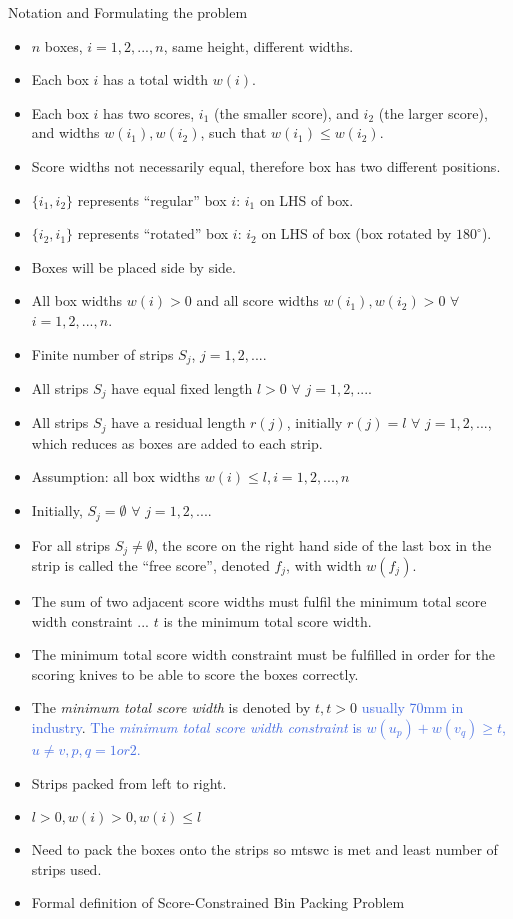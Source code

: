 \documentclass[oribibl]{llncs}
\begin{document}
Notation and Formulating the problem
\begin{itemize}
	\item $n$ boxes, $i = 1, 2, ..., n$, same height, different widths.
	\item Each box $i$ has a total width $w(i)$.
	\item Each box $i$ has two scores, $i_1$ (the smaller score), and $i_2$ (the larger score), and widths $w(i_1), w(i_2)$, such that $w(i_1) \leq w(i_2)$.
	\item Score widths not necessarily equal, therefore box has two different positions.
	\item $\{i_1, i_2\}$ represents ``regular'' box $i$: $i_1$ on LHS of box.
	\item $\{i_2, i_1\}$ represents ``rotated'' box $i$: $i_2$ on LHS of box (box rotated by $180^{\circ}$).
	\item Boxes will be placed side by side.
	\item All box widths $w(i) > 0$ and all score widths $w(i_1), w(i_2) > 0$ $\forall$ $i = 1, 2, ..., n$.
	\item Finite number of strips $S_j$, $j = 1, 2, ...$.
	\item All strips $S_j$ have equal fixed length $l > 0$ $\forall$ $j = 1, 2, ...$.
	\item All strips $S_j$ have a residual length $r(j)$, initially $r(j) = l$ $\forall$ $j = 1,2, ...$, which reduces as boxes are added to each strip.
	\item Assumption: all box widths $w(i) \leq l, i = 1, 2, ..., n$
	\item Initially, $S_j = \emptyset$ $\forall$ $j = 1, 2, ...$.
	\item For all strips $S_j \neq \emptyset$, the score on the right hand side of the last box in the strip is called the ``free score'', denoted $f_j$, with width $w(f_j)$.
	\item The sum of two adjacent score widths must fulfil the minimum total score width constraint ... $t$ is the minimum total score width.
	\item The minimum total score width constraint must be fulfilled in order for the scoring knives to be able to score the boxes correctly.
	\item The \textit{minimum total score width} is denoted by $t, t > 0$ \textcolor{RoyalBlue}{usually 70mm in industry}. \textcolor{RoyalBlue}{The \textit{minimum total score width constraint} is $w(u_p) + w(v_q) \geq t$, $u \neq v, p, q = 1 or 2$.}
	\item Strips packed from left to right.
	\item $l > 0, w(i) > 0, w(i) \leq l$
	\item Need to pack the boxes onto the strips so mtswc is met and least number of strips used.
	\item Formal definition of Score-Constrained Bin Packing Problem
\end{itemize}
\end{document}
